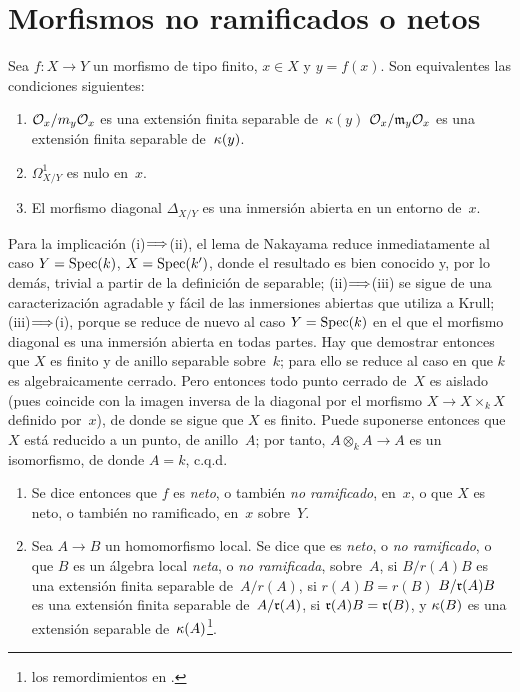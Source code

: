 \section{Morfismos no ramificados o netos}
\label{I.3}
\begin{proposition}
\label{I.3.1}
Sea $f\colon X\to Y$ un morfismo de tipo finito, $x\in X$ y $y=f(x)$. Son equivalentes las condiciones siguientes:
\begin{enumerate}
\item[(i)] 
{$\cal{O}_x/m_y\cal{O}_x$ es una extensión finita separable de~$\kappa(y)$}
{$\cal{O}_x/\goth{m}_y\cal{O}_x$ es una extensión finita separable de~$\kres(y)$}.
\item[(ii)] $\mathit{\Omega}^1_{X/Y}$ es nulo en~$x$.
\item[(iii)] El morfismo diagonal $\Delta_{X/Y}$ es una inmersión abierta en un entorno de~$x$.
\end{enumerate}
\end{proposition}
Para la implicación (i)$\To$(ii), el lema de Nakayama reduce inmediatamente al caso $Y=\Spec(k)$, $X=\Spec(k')$, donde el resultado es bien conocido y, por lo demás, trivial a partir de la definición de separable; (ii)$\To$(iii) se sigue de una caracterización agradable y fácil de las inmersiones abiertas que utiliza a Krull; (iii)$\To$(i), porque se reduce de nuevo al caso $Y=\Spec(k)$ en el que el morfismo diagonal es una inmersión abierta en todas partes. Hay que demostrar entonces que $X$ es finito y de anillo separable sobre~$k$; para ello se reduce al caso en que $k$ es algebraicamente cerrado. Pero entonces todo punto cerrado de~$X$ es aislado (pues coincide con la imagen inversa de la diagonal por el morfismo $X\to X\times_k X$ definido por~$x$), de donde se sigue que $X$ es finito. Puede suponerse entonces que $X$ está reducido a un punto, de anillo~$A$; por tanto, $A\otimes_k A\to A$ es un isomorfismo, de donde $A=k$, c.q.d.

\begin{definition}
\label{I.3.2}
\begin{enumerate}
\item[a)] Se dice entonces que $f$ es \emph{neto},
%
o también \emph{no ramificado},
%
en~$x$, o que $X$ es neto, o también no ramificado, en~$x$ sobre~$Y$.
\item[b)] Sea $A\to B$ un homomorfismo local. Se dice que es \emph{neto}, o \emph{no ramificado}, o que $B$ es un álgebra local \emph{neta}, o \emph{no ramificada}, sobre~$A$, si
{$B/r(A)B$ es una extensión finita separable de~$A/r(A)$, \ie si $r(A)B=r(B)$}
{$B/\goth{r}(A)B$ es una extensión finita separable de~$A/\goth{r}(A)$, \ie si $\goth{r}(A)B=\goth{r}(B)$},
y $\kres(B)$ es una extensión separable de~$\kres(A)$\kern1pt\footnote{\Cf los remordimientos en .}.
\end{enumerate}
\end{definition}

